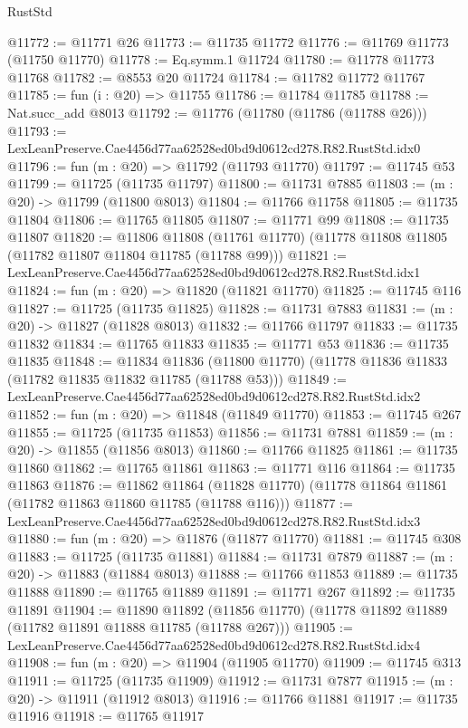 \begin{lexlean}{RustStd}
\begin{coremodule}
@11772 := @11771 @26
@11773 := @11735 @11772
@11776 := @11769 @11773 (@11750 @11770)
@11778 := Eq.symm.{1} @11724
@11780 := @11778 @11773 @11768
@11782 := @8553 @20 @11724
@11784 := @11782 @11772 @11767
@11785 := fun (i : @20) => @11755
@11786 := @11784 @11785
@11788 := Nat.succ_add @8013
@11792 := @11776 (@11780 (@11786 (@11788 @26)))
@11793 := LexLeanPreserve.Cae4456d77aa62528ed0bd9d0612cd278.R82.RustStd.idx0
@11796 := fun (m : @20) => @11792 (@11793 @11770)
@11797 := @11745 @53
@11799 := @11725 (@11735 @11797)
@11800 := @11731 @7885
@11803 := (m : @20) -> @11799 (@11800 @8013)
@11804 := @11766 @11758
@11805 := @11735 @11804
@11806 := @11765 @11805
@11807 := @11771 @99
@11808 := @11735 @11807
@11820 := @11806
    @11808
    (@11761 @11770)
    (@11778 @11808 @11805 (@11782 @11807 @11804 @11785 (@11788 @99)))
@11821 := LexLeanPreserve.Cae4456d77aa62528ed0bd9d0612cd278.R82.RustStd.idx1
@11824 := fun (m : @20) => @11820 (@11821 @11770)
@11825 := @11745 @116
@11827 := @11725 (@11735 @11825)
@11828 := @11731 @7883
@11831 := (m : @20) -> @11827 (@11828 @8013)
@11832 := @11766 @11797
@11833 := @11735 @11832
@11834 := @11765 @11833
@11835 := @11771 @53
@11836 := @11735 @11835
@11848 := @11834
    @11836
    (@11800 @11770)
    (@11778 @11836 @11833 (@11782 @11835 @11832 @11785 (@11788 @53)))
@11849 := LexLeanPreserve.Cae4456d77aa62528ed0bd9d0612cd278.R82.RustStd.idx2
@11852 := fun (m : @20) => @11848 (@11849 @11770)
@11853 := @11745 @267
@11855 := @11725 (@11735 @11853)
@11856 := @11731 @7881
@11859 := (m : @20) -> @11855 (@11856 @8013)
@11860 := @11766 @11825
@11861 := @11735 @11860
@11862 := @11765 @11861
@11863 := @11771 @116
@11864 := @11735 @11863
@11876 := @11862
    @11864
    (@11828 @11770)
    (@11778 @11864 @11861 (@11782 @11863 @11860 @11785 (@11788 @116)))
@11877 := LexLeanPreserve.Cae4456d77aa62528ed0bd9d0612cd278.R82.RustStd.idx3
@11880 := fun (m : @20) => @11876 (@11877 @11770)
@11881 := @11745 @308
@11883 := @11725 (@11735 @11881)
@11884 := @11731 @7879
@11887 := (m : @20) -> @11883 (@11884 @8013)
@11888 := @11766 @11853
@11889 := @11735 @11888
@11890 := @11765 @11889
@11891 := @11771 @267
@11892 := @11735 @11891
@11904 := @11890
    @11892
    (@11856 @11770)
    (@11778 @11892 @11889 (@11782 @11891 @11888 @11785 (@11788 @267)))
@11905 := LexLeanPreserve.Cae4456d77aa62528ed0bd9d0612cd278.R82.RustStd.idx4
@11908 := fun (m : @20) => @11904 (@11905 @11770)
@11909 := @11745 @313
@11911 := @11725 (@11735 @11909)
@11912 := @11731 @7877
@11915 := (m : @20) -> @11911 (@11912 @8013)
@11916 := @11766 @11881
@11917 := @11735 @11916
@11918 := @11765 @11917

\end{coremodule}
\end{lexlean}
